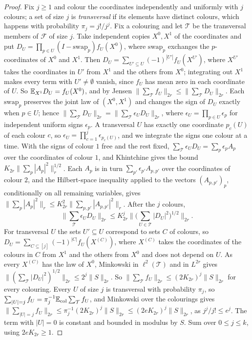 \begin{proof}
Fix $j\ge1$ and colour the coordinates independently and uniformly with $j$
colours; a set of size $j$ is \emph{transversal} if its elements have distinct
colours, which happens with probability $\pi_j=j!/j^j$. Fix a colouring and let
$\mathcal T$ be the transversal members of $\mathcal F$ of size $j$. Take
independent copies $X^0,X^1$ of the coordinates and put
$D_U=\prod_{p\in U}(I-\mathrm{swap}_p)f_U(X^0)$, where $\mathrm{swap}_p$
exchanges the $p$-coordinates of $X^0$ and $X^1$. Then
$D_U=\sum_{U'\subseteq U}(-1)^{|U'|}f_U(X^{U'})$, where $X^{U'}$ takes the
coordinates in $U'$ from $X^1$ and the others from $X^0$; integrating out $X^1$
makes every term with $U'\ne\emptyset$ vanish, since $f_U$ has mean zero in
each coordinate of $U$. So
$\mathbb E_{X^1}D_U=f_U(X^0)$, and by Jensen
$\|\sum_{\mathcal T}f_U\|_{2r}\le\|\sum_{\mathcal T}D_U\|_{2r}$. Each
$\mathrm{swap}_p$ preserves the joint law of $(X^0,X^1)$ and changes the sign of
$D_U$ exactly when $p\in U$; hence
$\|\sum_{\mathcal T}D_U\|_{2r}=\|\sum_{\mathcal T}\epsilon_UD_U\|_{2r}$, where
$\epsilon_U=\prod_{p\in U}\epsilon_p$ for independent uniform signs $\epsilon_p$.
A transversal $U$ has exactly one coordinate $p_c(U)$ of each colour $c$, so
$\epsilon_U=\prod_{c=1}^j\epsilon_{p_c(U)}$, and we integrate the signs one colour
at a time. With the signs of colour $1$ free and the rest fixed,
$\sum_{\mathcal T}\epsilon_UD_U=\sum_p\epsilon_pA_p$ over the coordinates of colour
$1$, and Khintchine gives the bound $K_{2r}\|\sum_p|A_p|^2\|_r^{1/2}$. Each $A_p$
is in turn $\sum_{p'}\epsilon_{p'}A_{p,p'}$ over the coordinates of colour $2$,
and the Hilbert-space inequality applied to the vectors
$(A_{p,p'})_p$, conditionally on all remaining variables, gives
$\|\sum_p|A_p|^2\|_r\le K_{2r}^2\|\sum_{p,p'}|A_{p,p'}|^2\|_r$. After the $j$
colours,
\[
 \Big\|\sum_{\mathcal T}\epsilon_UD_U\Big\|_{2r}
 \le K_{2r}^j\Big\|\Big(\sum_{U\in\mathcal T}|D_U|^2\Big)^{1/2}\Big\|_{2r}.
\]
For transversal $U$ the sets $U'\subseteq U$ correspond to sets $C$ of colours,
so $D_U=\sum_{C\subseteq[j]}(-1)^{|C|}f_U(X^{(C)})$, where $X^{(C)}$ takes the
coordinates of the colours in $C$ from $X^1$ and the others from $X^0$ and does
not depend on $U$. As every $X^{(C)}$ has the law of $X^0$, Minkowski in
$\ell^2(\mathcal T)$ and in $L^{2r}$ gives
$\|(\sum_{\mathcal T}|D_U|^2)^{1/2}\|_{2r}\le2^j\|S\|_{2r}$. So
$\|\sum_{\mathcal T}f_U\|_{2r}\le(2K_{2r})^j\|S\|_{2r}$ for every colouring. Every
$U$ of size $j$ is transversal with probability $\pi_j$, so
$\sum_{|U|=j}f_U=\pi_j^{-1}\mathbb E_{\rm col}\sum_{\mathcal T}f_U$, and Minkowski over
the colourings gives
$\|\sum_{|U|=j}f_U\|_{2r}\le\pi_j^{-1}(2K_{2r})^j\|S\|_{2r}\le(2eK_{2r})^j\|S\|_{2r}$,
as $j^j/j!\le e^j$. The term with $|U|=0$ is constant and bounded in modulus by
$S$. Sum over $0\le j\le k$, using $2eK_{2r}\ge1$.
\end{proof}

